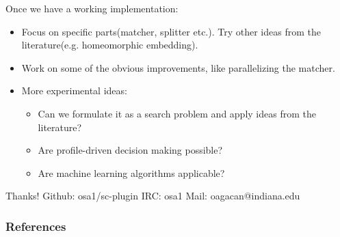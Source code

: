 \documentclass{beamer}
\begin{document}
\begin{frame}
    Once we have a working implementation:
    \begin{itemize}
        \item
            Focus on specific parts(matcher, splitter etc.). Try other
            ideas from the literature(e.g. homeomorphic embedding).
        \item
            Work on some of the obvious improvements, like parallelizing
            the matcher.
        \item
            More experimental ideas:
            \begin{itemize}
                \item[]
                    Can we formulate it as a search problem and apply
                    ideas from the literature?
                \item[]
                    Are profile-driven decision making possible?
                \item[]
                    Are machine learning algorithms applicable?
            \end{itemize}
    \end{itemize}

    \bigskip
    Thanks!
    \newline
    Github: osa1/sc-plugin \hspace{0.3cm} IRC: osa1 \hspace{0.3cm} Mail:
    oagacan@indiana.edu

\end{frame}

\begin{frame}[allowframebreaks]
    \frametitle{References}

    
    
\end{frame}
\end{document}
